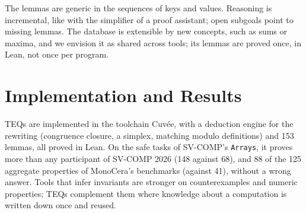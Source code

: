 \documentclass[english]{lni}
\begin{document}
The lemmas are generic in the sequences of keys and values. Reasoning is incremental, like with the simplifier of a
proof assistant; open subgoals point to missing lemmas. The database is extensible by new concepts, such as sums or
maxima, and we envision it as shared across tools; its lemmas are proved once, in Lean, not once per program.

\section{Implementation and Results}

TEQs are implemented in the toolchain Cuvée, with a deduction engine for the rewriting (congruence closure, a
simplex, matching modulo definitions) and 153 lemmas, all proved in Lean. On the safe tasks of SV-COMP's
\texttt{Arrays}, it proves more than any participant of SV-COMP 2026 (148 against 68), and 88 of the 125 aggregate
properties of MonoCera's benchmarks (against 41), without a wrong answer. Tools that infer invariants are stronger on
counterexamples and numeric properties; TEQs complement them where knowledge about a computation is written down once
and reused.

\printbibliography
\end{document}

